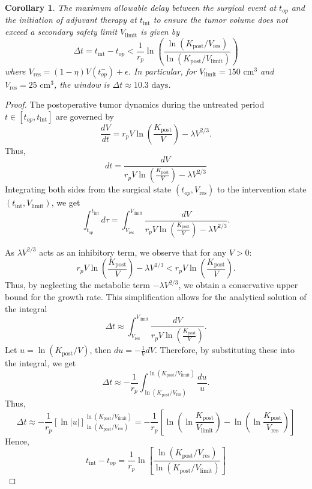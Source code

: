 \documentclass[11pt, reqno]{amsart}
\numberwithin{equation}{section}
\newtheorem{corollary}{Corollary}[theorem]
\theoremstyle{definition}
\begin{document}
\begin{corollary}%
\label{cor:window}
The maximum allowable delay between the surgical event at $t_{op}$ and the initiation of adjuvant therapy at $t_{\text{int}}$ to ensure the tumor volume does not exceed a secondary safety limit $V_{\text{limit}}$ is given by
\begin{equation}
\Delta t = t_{\text{int}} - t_{op} < \frac{1}{r_p}\ln\left(\frac{\ln(K_{\text{post}}/V_{\text{res}})}{\ln(K_{\text{post}}/V_{\text{limit}})}\right)
\end{equation}
where $V_{\text{res}} = (1-\eta)V(t_{op}^-) + \epsilon$. In particular, for $V_{\text{limit}} = 150 \text{ cm}^3$ and $V_{\text{res}} = 25 \text{ cm}^3$, the window is $\Delta t \approx 10.3 \text{ days}$.
\end{corollary}
\begin{proof}
The postoperative tumor dynamics during the untreated period $t \in [t_{op}, t_{\text{int}}]$ are governed by 
\begin{equation}
\frac{dV}{dt} = r_p V \ln \left( \frac{K_{\text{post}}}{V} \right) - \lambda V^{2/3}.
\end{equation}
Thus,
\[ dt = \frac{dV}{r_p V \ln \left( \frac{K_{\text{post}}}{V} \right) - \lambda V^{2/3}} \]
Integrating both sides from the surgical state $(t_{op}, V_{\text{res}})$ to the intervention state $(t_{\text{int}}, V_{\text{limit}})$, we get
\begin{equation}
\int_{t_{op}}^{t_{\text{int}}} d\tau = \int_{V_{\text{res}}}^{V_{\text{limit}}} \frac{dV}{r_p V \ln \left( \frac{K_{\text{post}}}{V} \right) - \lambda V^{2/3}}.
\end{equation}

As $\lambda V^{2/3}$ acts as an inhibitory term, we observe that for any $V > 0$:
\[ r_p V \ln \left( \frac{K_{\text{post}}}{V} \right) - \lambda V^{2/3} < r_p V \ln \left( \frac{K_{\text{post}}}{V} \right). \]
Thus, by neglecting the metabolic term $-\lambda V^{2/3}$, we obtain a conservative upper bound for the growth rate. This simplification allows for the analytical solution of the integral
\[ \Delta t \approx \int_{V_{\text{res}}}^{V_{\text{limit}}} \frac{dV}{r_p V \ln \left( \frac{K_{\text{post}}}{V}\right) }. \]
Let $u = \ln(K_{\text{post}}/V)$, then $du = -\frac{1}{V}dV$. Therefore, by substituting these into the integral, we get
\[ \Delta t \approx -\frac{1}{r_p} \int_{\ln(K_{\text{post}}/V_{\text{res}})}^{\ln(K_{\text{post}}/V_{\text{limit}})} \frac{du}{u}. \]
Thus,
\[ \Delta t \approx -\frac{1}{r_p} \left[ \ln|u| \right]_{\ln(K_{\text{post}}/V_{\text{res}})}^{\ln(K_{\text{post}}/V_{\text{limit}})} = -\frac{1}{r_p} \left[ \ln \left( \ln \frac{K_{\text{post}}}{V_{\text{limit}}} \right) - \ln \left( \ln \frac{K_{\text{post}}}{V_{\text{res}}} \right) \right] \]
Hence,
\begin{equation}
t_{\text{int}} - t_{op} = \frac{1}{r_p} \ln \left[ \frac{\ln(K_{\text{post}}/V_{\text{res}})}{\ln(K_{\text{post}}/V_{\text{limit}})} \right]
\end{equation}


\end{proof}
\end{document}
